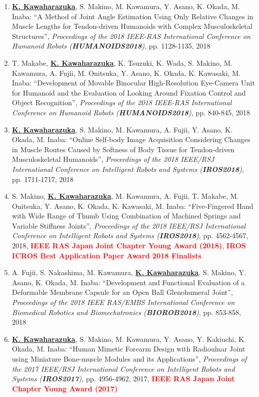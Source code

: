 \documentclass[letterpaper]{article}
\begin{document}
\begin{enumerate}
\item \underline{\textbf{K. Kawaharazuka}}, S. Makino, M. Kawamura, Y. Asano, K. Okada, M. Inaba: ``A Method of Joint Angle Estimation Using Only Relative Changes in Muscle Lengths for Tendon-driven Humanoids with Complex Musculoskeletal Structures'', \textit{Proceedings of the 2018 IEEE-RAS International Conference on Humanoid Robots (\textit{\textbf{HUMANOIDS2018}})}, pp. 1128-1135, 2018
\item T. Makabe, \underline{\textbf{K. Kawaharazuka}}, K. Tsuzuki, K. Wada, S. Makino, M. Kawamura, A. Fujii, M. Onitsuka, Y. Asano, K. Okada, K. Kawasaki, M. Inaba: ``Development of Movable Binocular High-Resolution Eye-Camera Unit for Humanoid and the Evaluation of Looking Around Fixation Control and Object Recognition'', \textit{Proceedings of the 2018 IEEE-RAS International Conference on Humanoid Robots (\textit{\textbf{HUMANOIDS2018}})}, pp. 840-845, 2018
\item \underline{\textbf{K. Kawaharazuka}}, S. Makino, M. Kawamura, A. Fujii, Y. Asano, K. Okada, M. Inaba: ``Online Self-body Image Acquisition Considering Changes in Muscle Routes Caused by Softness of Body Tissue for Tendon-driven Musculoskeletal Humanoids'', \textit{Proceedings of the 2018 IEEE/RSJ International Conference on Intelligent Robots and Systems (\textit{\textbf{IROS2018}})}, pp. 1711-1717, 2018
\item S. Makino, \underline{\textbf{K. Kawaharazuka}}, M. Kawamura, A. Fujii, T. Makabe, M. Onitsuka, Y. Asano, K. Okada, K. Kawasaki, M. Inaba: ``Five-Fingered Hand with Wide Range of Thumb Using Combination of Machined Springs and Variable Stiffness Joints'', \textit{Proceedings of the 2018 IEEE/RSJ International Conference on Intelligent Robots and Systems (\textit{\textbf{IROS2018}})}, pp. 4562-4567, 2018, \textbf{\textcolor{red}{IEEE RAS Japan Joint Chapter Young Award (2018)}}, \textbf{\textcolor{red}{IROS ICROS Best Application Paper Award 2018 Finalists}}
\item A. Fujii, S. Nakashima, M. Kawamura, \underline{\textbf{K. Kawaharazuka}}, S. Makino, Y. Asano, K. Okada, M. Inaba: ``Development and Functional Evaluation of a Deformable Membrane Capsule for an Open Ball Glenohumeral Joint'', \textit{Proceedings of the 2018 IEEE RAS/EMBS International Conference on Biomedical Robotics and Biomechatronics (\textit{\textbf{BIOROB2018}})}, pp. 853-858, 2018
\item \underline{\textbf{K. Kawaharazuka}}, S. Makino, M. Kawamura, Y. Asano, Y. Kakiuchi, K. Okada, M. Inaba: ``Human Mimetic Forearm Design with Radioulnar Joint using Miniature Bone-muscle Modules and its Applications'', \textit{Proceedings of the 2017 IEEE/RSJ International Conference on Intelligent Robots and Systems (\textit{\textbf{IROS2017}})}, pp. 4956-4962, 2017, \textbf{\textcolor{red}{IEEE RAS Japan Joint Chapter Young Award (2017)}}

\end{enumerate}
\end{document}
